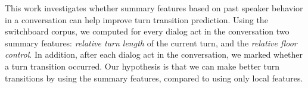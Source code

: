 This work investigates whether summary features based on past speaker behavior in a conversation can help improve turn transition prediction. 
Using the switchboard corpus, we computed for every dialog act in the conversation two summary features: \textit{relative turn length} of the current turn, and the \textit{relative floor control}.
In addition, after each dialog act in the conversation, we marked whether a turn transition occurred. Our hypothesis is that we can make better
turn transitions by using the summary features, compared to using only local features.  
  